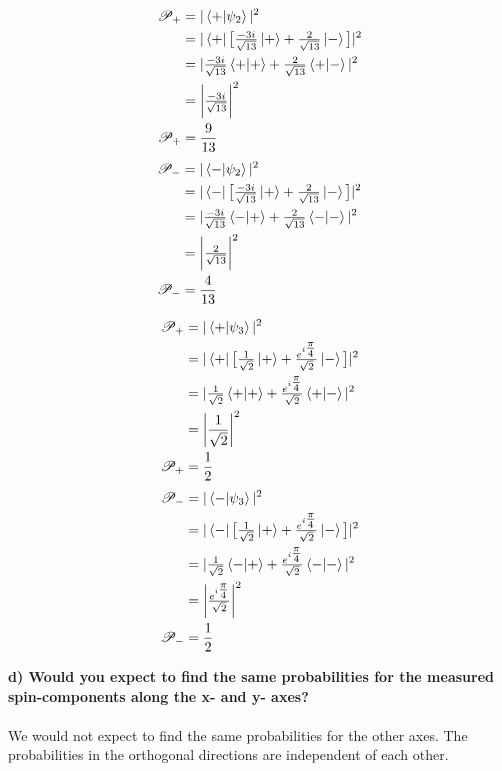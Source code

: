 \documentclass[paper=a4, fontsize=11pt]{scrartcl} %
\numberwithin{equation}{section} %
\numberwithin{figure}{section} %
\numberwithin{table}{section} %
\begin{document}
  \begin{multicols}{2}
  \noindent
  \begin{align*}
 \mathscr{P_+} & = |\braket{+|\psi_2 }|^2 \\
 & = |\bra{+} \big[ \tfrac{-3i}{\sqrt{13}}\ket{+} + \tfrac{2}{\sqrt{13}} \ket{-} \big] |^2 \\
 & = |\tfrac{-3i}{\sqrt{13}} \braket{+|+} + \tfrac{2}{\sqrt{13}} \braket{+|-}|^2 \\
 & = \bigg | \tfrac{-3i}{\sqrt{13}} \bigg |^2 \\
\mathscr{P_+} & = \frac{9}{13}
  \end{align*}
   \begin{align*}
 \mathscr{P_-} & = |\braket{-|\psi_2 }|^2 \\
 & = |\bra{-} \big[ \tfrac{-3i}{\sqrt{13}}\ket{+} + \tfrac{2}{\sqrt{13}} \ket{-} \big] |^2 \\
 & = |\tfrac{-3i}{\sqrt{13}} \braket{-|+} + \tfrac{2}{\sqrt{13}} \braket{-|-}|^2 \\
 & = \bigg | \tfrac{2}{\sqrt{13}} \bigg |^2 \\
\mathscr{P_-} & = \frac{4}{13}
  \end{align*}
  \end{multicols}
  \begin{multicols}{2}
  \noindent
  \begin{align*}
  \mathscr{P_+} & = |\braket{+ | \psi_3}|^2 \\
  & = |\bra{+} \big [ \tfrac{1}{\sqrt{2}} \ket{+} + \tfrac{ e^{i\tfrac{\pi}{4}}}{\sqrt{2}} \ket{-} \big ]|^2 \\
  & = |\tfrac{1}{\sqrt{2}} \braket{+|+} + \tfrac{ e^{i\tfrac{\pi}{4}}}{\sqrt{2}} \braket{+|-}  |^2 \\
  & = \bigg | \frac{1}{\sqrt{2}} \bigg |^2 \\
  \mathscr{P_+} & = \frac{1}{2}
\end{align*}
\begin{align*}
  \mathscr{P_-} & = |\braket{- | \psi_3}|^2 \\
  & = |\bra{-} \big [ \tfrac{1}{\sqrt{2}} \ket{+} + \tfrac{ e^{i\tfrac{\pi}{4}}}{\sqrt{2}} \ket{-} \big ]|^2 \\
  & = |\tfrac{1}{\sqrt{2}} \braket{-|+} + \tfrac{ e^{i\tfrac{\pi}{4}}}{\sqrt{2}} \braket{-|-}  |^2 \\
  & = \bigg |  \tfrac{ e^{i\tfrac{\pi}{4}}}{\sqrt{2}} \bigg |^2 \\
  \mathscr{P_-} & = \frac{1}{2}
\end{align*}
\end{multicols}
 \textbf{d) Would you expect to find the same probabilities for the measured spin-components along the x- and y- axes?}\\
 \\
 We would not expect to find the same probabilities for the other axes. The probabilities in the orthogonal directions are independent of each other.  
\end{document}
